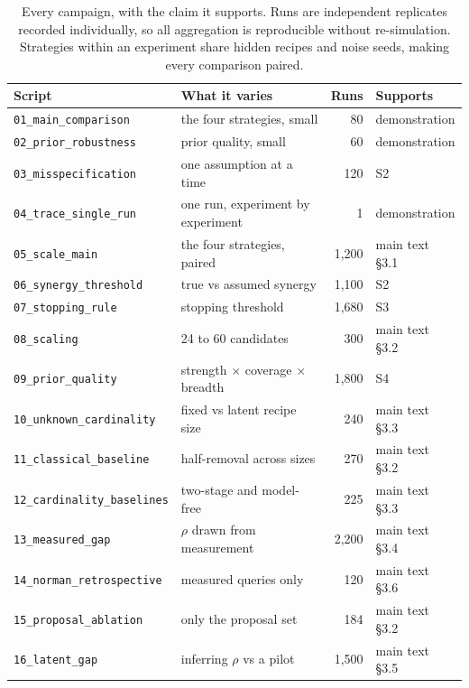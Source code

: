 \documentclass[10pt]{article}
\begin{document}
\begin{table}[h]
  \centering
  \small
  \begin{tabular}{llr l}
    \toprule
    Script & What it varies & Runs & Supports \\
    \midrule
    \texttt{01\_main\_comparison} & the four strategies, small & 80 & demonstration \\
    \texttt{02\_prior\_robustness} & prior quality, small & 60 & demonstration \\
    \texttt{03\_misspecification} & one assumption at a time & 120 & S2 \\
    \texttt{04\_trace\_single\_run} & one run, experiment by experiment & 1 & demonstration \\
    \texttt{05\_scale\_main} & the four strategies, paired & 1{,}200 & main text \S3.1 \\
    \texttt{06\_synergy\_threshold} & true vs assumed synergy & 1{,}100 & S2 \\
    \texttt{07\_stopping\_rule} & stopping threshold & 1{,}680 & S3 \\
    \texttt{08\_scaling} & 24 to 60 candidates & 300 & main text \S3.2 \\
    \texttt{09\_prior\_quality} & strength $\times$ coverage $\times$ breadth & 1{,}800 & S4 \\
    \texttt{10\_unknown\_cardinality} & fixed vs latent recipe size & 240 & main text \S3.3 \\
    \texttt{11\_classical\_baseline} & half-removal across sizes & 270 & main text \S3.2 \\
    \texttt{12\_cardinality\_baselines} & two-stage and model-free & 225 & main text \S3.3 \\
    \texttt{13\_measured\_gap} & $\rho$ drawn from measurement & 2{,}200 & main text \S3.4 \\
    \texttt{14\_norman\_retrospective} & measured queries only & 120 & main text \S3.6 \\
    \texttt{15\_proposal\_ablation} & only the proposal set & 184 & main text \S3.2 \\
    \texttt{16\_latent\_gap} & inferring $\rho$ vs a pilot & 1{,}500 & main text \S3.5 \\
    \bottomrule
  \end{tabular}
  \caption{Every campaign, with the claim it supports. Runs are independent
  replicates recorded individually, so all aggregation is reproducible without
  re-simulation. Strategies within an experiment share hidden recipes and noise
  seeds, making every comparison paired.}
  \label{tab:campaigns}
\end{table}
\end{document}
